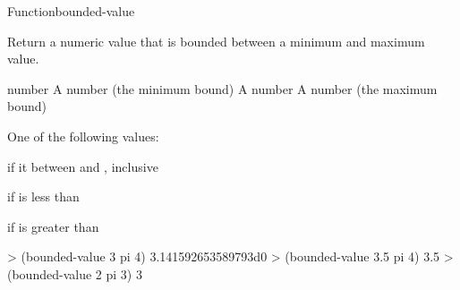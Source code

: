 \documentclass[10pt,twoside,english,pdftex]{article}
\begin{document}
\begin{functiondoc}{Function}{bounded-value}{
  \returns{} }
%

\fnsyntax

\fnpurpose Return a numeric value that is bounded between a minimum
and maximum value.

\fnpackage {}

\fnmodule {}

\fnargs
\begin{args}{number}
\arg[min] A number (the minimum bound)
\arg[number] A number
\arg[max] A number (the maximum bound)
\end{args}

\fnreturns One of the following values:
\begin{tightitemize}
\item {} if it between  and , inclusive
\item {} if  is less than 
\item {} if  is greater than 
\end{tightitemize}

\fnexamples
\begin{example}
> (bounded-value 3 pi 4)
3.141592653589793d0
> (bounded-value 3.5 pi 4)
3.5
> (bounded-value 2 pi 3)
3
\end{example}

\end{functiondoc}

\end{document}
